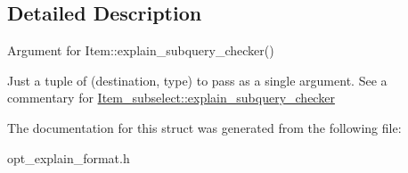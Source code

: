 \subsection{Detailed Description}
Argument for Item\+::explain\+\_\+subquery\+\_\+checker()

Just a tuple of (destination, type) to pass as a single argument. See a commentary for \mbox{\hyperlink{classItem__subselect_afd7dbf2095f70599df0a15fd0de9f9f5}{Item\+\_\+subselect\+::explain\+\_\+subquery\+\_\+checker}} 

The documentation for this struct was generated from the following file\+:\begin{DoxyCompactItemize}
\item 
opt\+\_\+explain\+\_\+format.\+h\end{DoxyCompactItemize}
